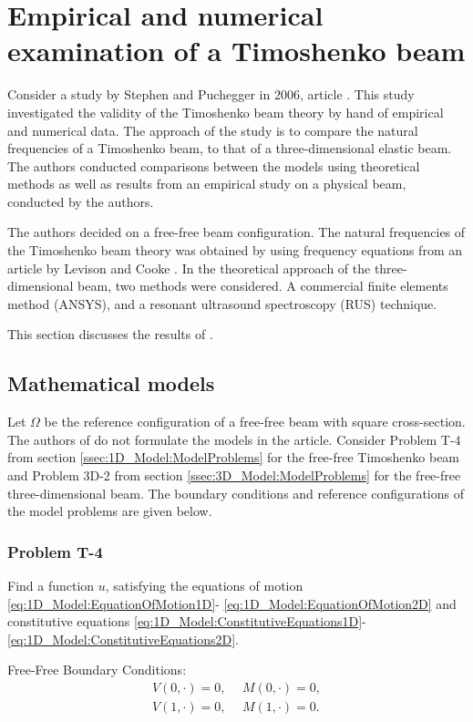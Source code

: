 \documentclass[../../main.tex]{subfiles}
\begin{document}
\section{Empirical and numerical examination of a Timoshenko beam} \label{sec:SP06}
Consider a study by Stephen and Puchegger in 2006, article \cite{SP06}. This study investigated the validity of the Timoshenko beam theory by hand of empirical and numerical data. The approach of the study is to compare the natural frequencies of a Timoshenko beam, to that of a three-dimensional elastic beam. The authors conducted comparisons between the models using theoretical methods as well as results from an empirical study on a physical beam, conducted by the authors.

The authors decided on a free-free beam configuration. The natural frequencies of the Timoshenko beam theory was obtained by using frequency equations from an article by Levison and Cooke \cite{LC81}. In the theoretical approach of the three-dimensional beam, two methods were considered. A commercial finite elements method (ANSYS), and a resonant ultrasound spectroscopy (RUS) technique.

This section discusses the results of \cite{SP06}.

\subsection{Mathematical models}
Let $\Omega$ be the reference configuration of a free-free beam with square cross-section. The authors of \cite{SP06} do not formulate the models in the article. Consider Problem T-4 from section \ref{ssec:1D_Model:ModelProblems} for the free-free Timoshenko beam and Problem 3D-2 from section \ref{ssec:3D_Model:ModelProblems} for the free-free three-dimensional beam. The boundary conditions and reference configurations of the model problems are given below.

\subsubsection*{Problem T-4}
Find a function $u$, satisfying the equations of motion \eqref{eq:1D_Model:EquationOfMotion1D}- \eqref{eq:1D_Model:EquationOfMotion2D} and constitutive equations \eqref{eq:1D_Model:ConstitutiveEquations1D}- \eqref{eq:1D_Model:ConstitutiveEquations2D}.

{Free-Free Boundary Conditions:}
\begin{eqnarray}
	V(0,\cdot) = 0, \ \ &M(0,\cdot) = 0, \label{BC_1}\\
	V(1,\cdot) = 0, \ \ &M(1,\cdot) = 0. \label{BC_2}
\end{eqnarray}
\end{document}
